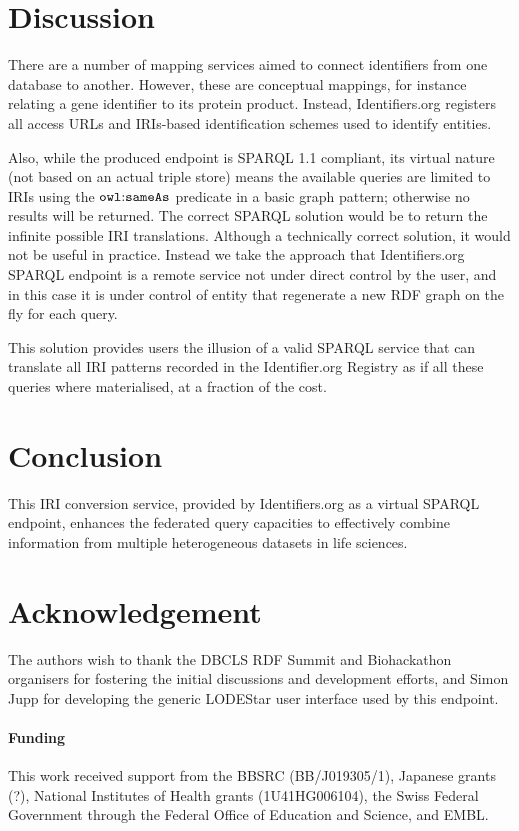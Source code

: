 \documentclass{bioinfo}
\begin{document}
\section{Discussion}
There are a number of mapping services aimed to connect identifiers from one database to another. However, these are conceptual mappings, for instance relating a gene identifier to its protein product. Instead, Identifiers.org registers all access URLs and IRIs-based identification schemes used to identify entities.

Also, while the produced endpoint is SPARQL 1.1 compliant, its virtual nature (not based on an actual triple store) means the available queries are limited to IRIs using the $\mathtt{owl\text{\rm :}{}sameAs}$ predicate in a basic graph pattern; otherwise no results will be returned. The correct SPARQL solution would be to return the infinite possible IRI translations. Although a technically correct solution, it would not be useful in practice. Instead we take the approach that Identifiers.org SPARQL endpoint is a remote service not under direct control by the user, and in this case it is under control of entity that regenerate a new RDF graph on the fly for each query.

This solution provides users the illusion of a valid SPARQL service that can translate all IRI patterns recorded in the Identifier.org Registry as if all these queries where materialised, at a fraction of the cost.

\section{Conclusion}
This IRI conversion service, provided by Identifiers.org as a virtual SPARQL endpoint, enhances the federated query capacities to effectively combine information from multiple heterogeneous datasets in life sciences.

\section*{Acknowledgement}
The authors wish to thank the DBCLS RDF Summit and Biohackathon organisers for fostering the initial discussions and development efforts, and Simon Jupp for developing the generic LODEStar user interface used by this endpoint.

\paragraph{Funding\textcolon} 
This work received support from the BBSRC (BB/J019305/1), Japanese grants (?), National Institutes of Health grants (1U41HG006104), the Swiss Federal Government through the Federal Office of Education and Science, and EMBL.  


%
%
%
%
%
%
%
%
  
\end{document}
